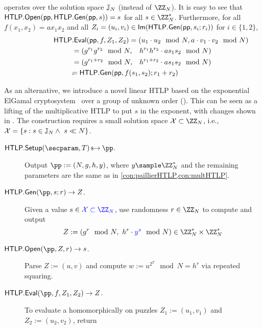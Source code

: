 \noindent {} operates over the solution space $\mathbb{J}_N$ (instead of $\ZZ_N$).
It is easy to see that $\mathsf{HTLP}.\mathsf{Open}(\mathsf{pp},\allowbreak \mathsf{HTLP}.{\sf Gen}(\mathsf{pp}, s)) = s$ for all $s \in \ZZ_N^*$. Furthermore, for all $f(x_1, x_2) = a x_1 x_2$ and all $Z_i = (u_i, v_i) \in {\sf Im}(\mathsf{HTLP}.{\sf Gen}(\mathsf{pp},\allowbreak s_i; r_i))$ for $i \in \{1,2\}$,
\begin{align*}
    \htlp&\rlap{$.{\sf Eval}(\pparam, f, Z_1, Z_2) = (u_1 \cdot u_2 \mod{N}, a \cdot v_1 \cdot v_2 \mod{N})$} &&\\
    &= (g^{r_1} g^{r_2} \mod{N}, &&h^{r_1} h^{r_2} \cdot a s_1 s_2 \mod{N})\\
    &= (g^{r_1 + r_2} \mod{N},   &&h^{r_1 + r_2} \cdot a s_1 s_2 \mod{N})\\
    &\rlap{$= \htlp.{\sf Gen}(\pparam, f(s_1, s_2); r_1 + r_2)$}. &&
\end{align*}

As an alternative, we introduce a novel linear HTLP based on the exponential ElGamal cryptosystem~\cite{EC:CraGenSch97} over a group of unknown order (). This can be seen as a lifting of the multiplicative HTLP to put $s$ in the exponent, with changes shown in .
The construction requires a small solution space $\X \subset \ZZ_N$, i.e., $\mathcal{X} = \{ s : s \in \mathbb{J}_N \land\ s \ll N \}$. 

\begin{construction}\label{con:exp_elgamalHTLP}
    \hfill
    \begin{description}
        \item[$\htlp.\Setup(\secparam, \Ttime) \randout \pp$.] Output $\pp := (N, g, h, y)$, where $y \sample \ZZ_N^*$ and the remaining parameters are the same as in \cref{con:paillierHTLP,con:multHTLP}.
        \item[$\htlp.{\sf Gen}(\pp, s; r) \rightarrow Z$.] Given a value $s \in \chblue{\X \subset \ZZ_N}$, use randomness $r \in \ZZ_{N}$ to compute and output
            $$Z := (g^r \mod{N},\ h^r \cdot \chblue{y^s} \mod{N}) \in \ZZ_N^* \times \ZZ_N^*$$
        \item[$\htlp.\Open(\pp, Z, r) \rightarrow s$.] Parse $Z := (u,v)$ and compute $w := u^{2^T} \mod{N} \allowbreak= h^r$ via repeated squaring. 
        \item[$\htlp.{\sf Eval}(\pp, f, Z_1, Z_2) \rightarrow Z$.] To evaluate a  homomorphically on puzzles $Z_1 := (u_1, v_1)$ and $Z_2 := (u_2, v_2)$, return
    \end{description}
\end{construction}


